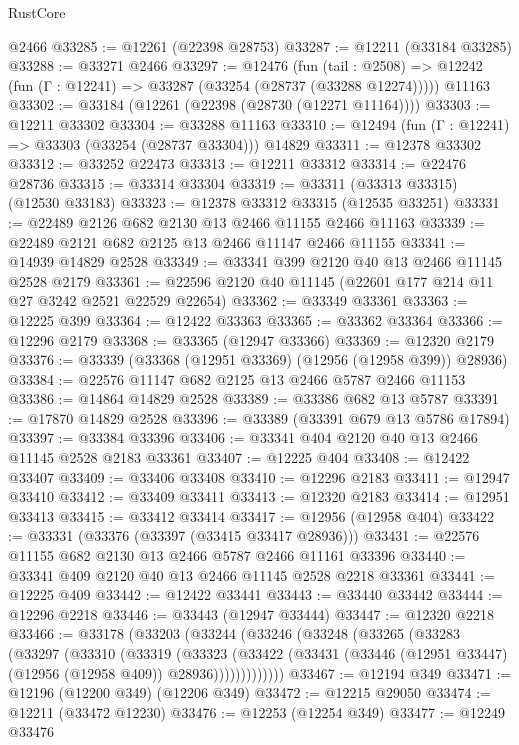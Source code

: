 \begin{lexlean}{RustCore}
\begin{coremodule}
    @2466
@33285 := @12261 (@22398 @28753)
@33287 := @12211 (@33184 @33285)
@33288 := @33271 @2466
@33297 := @12476
    (fun (tail : @2508) => @12242 (fun (Γ : @12241) => @33287 (@33254 (@28737 (@33288 @12274)))))
    @11163
@33302 := @33184 (@12261 (@22398 (@28730 (@12271 @11164))))
@33303 := @12211 @33302
@33304 := @33288 @11163
@33310 := @12494 (fun (Γ : @12241) => @33303 (@33254 (@28737 @33304))) @14829
@33311 := @12378 @33302
@33312 := @33252 @22473
@33313 := @12211 @33312
@33314 := @22476 @28736
@33315 := @33314 @33304
@33319 := @33311 (@33313 @33315) (@12530 @33183)
@33323 := @12378 @33312 @33315 (@12535 @33251)
@33331 := @22489 @2126 @682 @2130 @13 @2466 @11155 @2466 @11163
@33339 := @22489 @2121 @682 @2125 @13 @2466 @11147 @2466 @11155
@33341 := @14939 @14829 @2528
@33349 := @33341 @399 @2120 @40 @13 @2466 @11145 @2528 @2179
@33361 := @22596 @2120 @40 @11145 (@22601 @177 @214 @11 @27 @3242 @2521 @22529 @22654)
@33362 := @33349 @33361
@33363 := @12225 @399
@33364 := @12422 @33363
@33365 := @33362 @33364
@33366 := @12296 @2179
@33368 := @33365 (@12947 @33366)
@33369 := @12320 @2179
@33376 := @33339 (@33368 (@12951 @33369) (@12956 (@12958 @399)) @28936)
@33384 := @22576 @11147 @682 @2125 @13 @2466 @5787 @2466 @11153
@33386 := @14864 @14829 @2528
@33389 := @33386 @682 @13 @5787
@33391 := @17870 @14829 @2528
@33396 := @33389 (@33391 @679 @13 @5786 @17894)
@33397 := @33384 @33396
@33406 := @33341 @404 @2120 @40 @13 @2466 @11145 @2528 @2183 @33361
@33407 := @12225 @404
@33408 := @12422 @33407
@33409 := @33406 @33408
@33410 := @12296 @2183
@33411 := @12947 @33410
@33412 := @33409 @33411
@33413 := @12320 @2183
@33414 := @12951 @33413
@33415 := @33412 @33414
@33417 := @12956 (@12958 @404)
@33422 := @33331 (@33376 (@33397 (@33415 @33417 @28936)))
@33431 := @22576 @11155 @682 @2130 @13 @2466 @5787 @2466 @11161 @33396
@33440 := @33341 @409 @2120 @40 @13 @2466 @11145 @2528 @2218 @33361
@33441 := @12225 @409
@33442 := @12422 @33441
@33443 := @33440 @33442
@33444 := @12296 @2218
@33446 := @33443 (@12947 @33444)
@33447 := @12320 @2218
@33466 := @33178
    (@33203
      (@33244
        (@33246
          (@33248
            (@33265
              (@33283
                (@33297
                  (@33310
                    (@33319
                      (@33323
                        (@33422
                          (@33431 (@33446 (@12951 @33447) (@12956 (@12958 @409)) @28936)))))))))))))
@33467 := @12194 @349
@33471 := @12196 (@12200 @349) (@12206 @349)
@33472 := @12215 @29050
@33474 := @12211 (@33472 @12230)
@33476 := @12253 (@12254 @349)
@33477 := @12249 @33476

\end{coremodule}
\end{lexlean}
